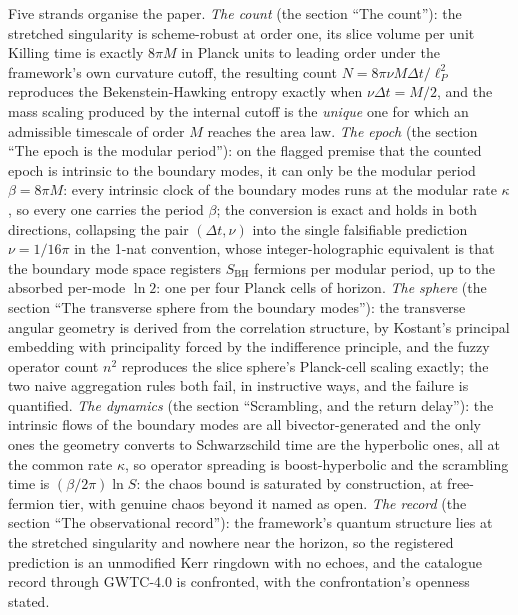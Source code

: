 \documentclass[11pt]{article}
\theoremstyle{definition}
\theoremstyle{plain}
\providecommand{\SBH}{}\renewcommand{\SBH}{S_{\mathrm{BH}}}
\providecommand{\lP}{}\renewcommand{\lP}{\ell_{P}}
\begin{document}
Five strands organise the paper. \emph{The count} (the section ``The count''): the stretched singularity is scheme-robust at order one, its slice volume per unit Killing time is exactly $8\pi M$ in Planck units to leading order under the framework's own curvature cutoff, the resulting count $N = 8\pi\nu M\Delta t/\lP^2$ reproduces the Bekenstein-Hawking entropy exactly when $\nu\Delta t = M/2$, and the mass scaling produced by the internal cutoff is the \emph{unique} one for which an admissible timescale of order $M$ reaches the area law. \emph{The epoch} (the section ``The epoch is the modular period''): on the flagged premise that the counted epoch is intrinsic to the boundary modes, it can only be the modular period $\beta = 8\pi M$: every intrinsic clock of the boundary modes runs at the modular rate $\kappa$, so every one carries the period $\beta$; the conversion is exact and holds in both directions, collapsing the pair $(\Delta t, \nu)$ into the single falsifiable prediction $\nu = 1/16\pi$ in the 1-nat convention, whose integer-holographic equivalent is that the boundary mode space registers $\SBH$ fermions per modular period, up to the absorbed per-mode $\ln 2$: one per four Planck cells of horizon. \emph{The sphere} (the section ``The transverse sphere from the boundary modes''): the transverse angular geometry is derived from the correlation structure, by Kostant's principal embedding with principality forced by the indifference principle, and the fuzzy operator count $n^2$ reproduces the slice sphere's Planck-cell scaling exactly; the two naive aggregation rules both fail, in instructive ways, and the failure is quantified. \emph{The dynamics} (the section ``Scrambling, and the return delay''): the intrinsic flows of the boundary modes are all bivector-generated and the only ones the geometry converts to Schwarzschild time are the hyperbolic ones, all at the common rate $\kappa$, so operator spreading is boost-hyperbolic and the scrambling time is $(\beta/2\pi)\ln S$: the chaos bound is saturated by construction, at free-fermion tier, with genuine chaos beyond it named as open. \emph{The record} (the section ``The observational record''): the framework's quantum structure lies at the stretched singularity and nowhere near the horizon, so the registered prediction is an unmodified Kerr ringdown with no echoes, and the catalogue record through GWTC-4.0 is confronted, with the confrontation's openness stated.
\end{document}
